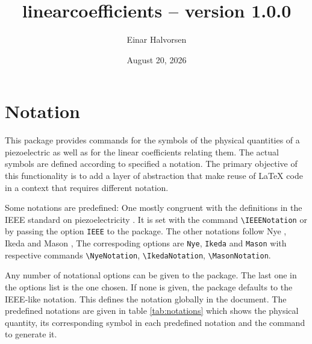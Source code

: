 \documentclass[a4paper, 12pt]{article}
\begin{document}
\title{linearcoefficients -- version 1.0.0}
\author{Einar Halvorsen}
\date{August 20, 2026}
\maketitle


\section{Notation}
This package provides commands for the symbols of the physical quantities of a piezoelectric as well as for the linear coefficients relating them. The actual symbols are defined according to specified a notation. The primary objective of this functionality is to add a layer of abstraction that make reuse of \LaTeX{} code in a context that requires different notation.

Some notations are predefined: One mostly congruent with the definitions in the IEEE standard on piezoelectricity \cite{IEEEpiezostd1996}. It is set with the command \verb|\IEEENotation| or by passing the option \verb|IEEE| to the package. The other notations follow Nye \cite{Nye1985}, Ikeda \cite{Ikeda1996} and Mason \cite{Mason1958}, The correspoding options are \verb|Nye|, \verb|Ikeda| and \verb|Mason| with respective commands \verb|\NyeNotation|, \verb|\IkedaNotation|, \verb|\MasonNotation|. 

Any number of notational options can be given to the package. The last one in the options list is the one chosen. If none is given, the package defaults to the IEEE-like notation. This defines the notation globally in the document.
The predefined notations are given in table \ref{tab:notations} which shows the physical quantity, its corresponding symbol in each predefined notation and the command to generate it.
\end{document}

